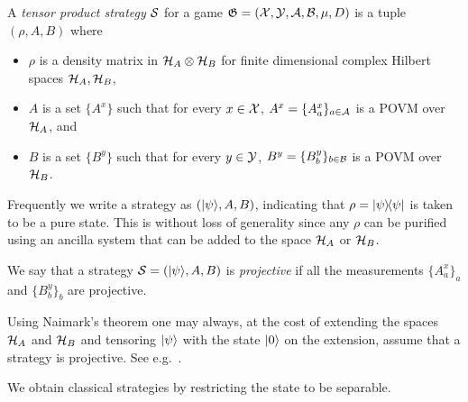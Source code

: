 \begin{definition}
  \label{definition-tensorstrategy}
  A \emph{tensor product strategy} $\strategy$ for a game $\game = (\cal{X},
  \cal{Y}, \cal{A}, \cal{B}, \mu, D)$ is a tuple $(\rho, A, B)$ where
  \begin{itemize}
	\item $\rho$ is a density matrix in $\mH_A \otimes \mH_B$ for finite
    dimensional complex Hilbert spaces $\mH_A, \mH_B$,
	\item $A$ is a set $\{A^x\}$ such that for every $x \in \cal{X}$, $A^x =
    \{A^x_a \}_{a \in \cal{A}}$ is a POVM over $\mH_A$, and
	\item $B$ is a set $\{B^y\}$ such that for every $y \in \cal{Y}$, $B^y =
    \{B^y_b \}_{b \in \cal{B}}$ is a POVM over $\mH_B$.
\end{itemize}
\end{definition}

Frequently we write a strategy as $(\ket{\psi}, A, B)$, indicating that $\rho = \proj{\psi}$ is taken to be a pure state. This is without loss of generality since any $\rho$ can be purified using an ancilla system that can be added to the space $\mH_A$ or $\mH_B$. 

\begin{definition}
  \label{definition-projective-strategy}
  We say that a strategy $\strategy = (\ket{\psi}, A, B)$ is \emph{projective} if
  all the measurements $\{A^x_a\}_a$ and $\{B^y_b\}_b$ are projective.
\end{definition}

\begin{remark}\label{remark-projective}
Using Naimark's theorem one may always, at the cost of extending the spaces $\mH_A$ and $\mH_B$ and tensoring $\ket{\psi}$ with the state $\ket{0}$ on the extension, assume that a strategy is projective. See e.g.~\cite[Theorem 4.2]{NW19}.
\end{remark}

We obtain classical strategies by restricting the state to be separable. 


